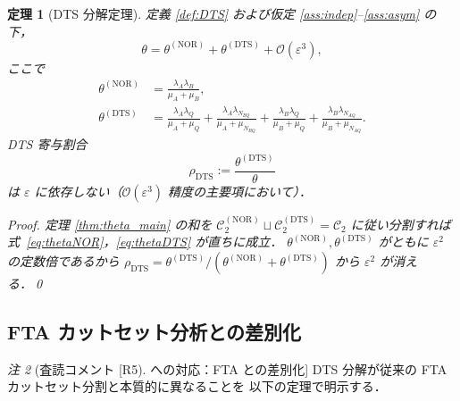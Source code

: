 \documentclass[12pt,a4paper]{article}
\theoremstyle{plain}
\newtheorem{theorem}{定理}[section]
\theoremstyle{definition}
\theoremstyle{remark}
\newtheorem{remark}[theorem]{注}
\newcommand{\calO}{\mathcal{O}}
\newcommand{\eps}{\varepsilon}
\newcommand{\calCtwo}{\mathcal{C}_2}
\newcommand{\calCNOR}{\calCtwo^{(\mathrm{NOR})}}
\newcommand{\calCDTS}{\calCtwo^{(\mathrm{DTS})}}
\newcommand{\thetaNOR}{\theta^{(\mathrm{NOR})}}
\newcommand{\thetaDTS}{\theta^{(\mathrm{DTS})}}
\newcommand{\rhoDTS}{\rho_{\mathrm{DTS}}}
\begin{document}
\begin{theorem}[DTS 分解定理]\label{thm:DTS}
  定義 \ref{def:DTS} および仮定 \ref{ass:indep}--\ref{ass:asym} の下，
  \begin{equation}\label{eq:theta_decomp}
    \theta = \thetaNOR + \thetaDTS + \calO(\eps^3),
  \end{equation}
  ここで
  \begin{align}
    \thetaNOR &= \frac{\lambda_A\lambda_B}{\mu_A+\mu_B},
    \label{eq:thetaNOR}\\
    \thetaDTS &= \frac{\lambda_A\lambda_Q}{\mu_A+\mu_Q}
               + \frac{\lambda_A\lambda_{N_{BQ}}}{\mu_A+\mu_{N_{BQ}}}
               + \frac{\lambda_B\lambda_Q}{\mu_B+\mu_Q}
               + \frac{\lambda_B\lambda_{N_{AQ}}}{\mu_B+\mu_{N_{AQ}}}.
    \label{eq:thetaDTS}
  \end{align}
  DTS 寄与割合
  \begin{equation}\label{eq:rhoDTS}
    \rhoDTS := \frac{\thetaDTS}{\theta}
  \end{equation}
  は $\eps$ に依存しない（$\calO(\eps^3)$ 精度の主要項において）．

  \begin{proof}
    定理 \ref{thm:theta_main} の和を $\calCNOR\sqcup\calCDTS=\calCtwo$ に従い分割すれば
    式~\eqref{eq:thetaNOR}，\eqref{eq:thetaDTS} が直ちに成立．
    $\thetaNOR, \thetaDTS$ がともに $\eps^2$ の定数倍であるから
    $\rhoDTS = \thetaDTS/(\thetaNOR+\thetaDTS)$ から $\eps^2$ が消える．\qed
  \end{proof}
\end{theorem}

\subsection{FTA カットセット分析との差別化}

\begin{remark}[査読コメント [R5] への対応：FTA との差別化]
  DTS 分解が従来の FTA カットセット分割と本質的に異なることを
  以下の定理で明示する．
\end{remark}
\end{document}
